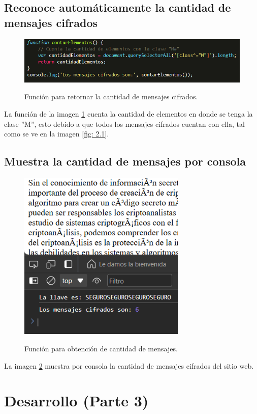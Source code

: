 \documentclass[letter,12pt]{article}
\begin{document}
\subsection{Reconoce automáticamente la cantidad de mensajes cifrados}
    \begin{figure}[H]
        \centering
        \includegraphics[width=15cm]{img/parte 2/3.1.png}
        \label{fig: 3.1}
        \caption{Función para retornar la cantidad de mensajes cifrados.}
    \end{figure}

La función de la imagen \ref{fig: 3.1} cuenta la cantidad de elementos en donde se tenga la clase ''M'', esto debido a que todos los mensajes cifrados cuentan con ella, tal como se ve en la imagen \ref{fig: 2.1}.

\subsection{Muestra la cantidad de mensajes por consola}
    \begin{figure}[H]
        \centering
        \includegraphics[width=8cm]{img/parte 2/cantidad.png}
        \label{fig: cantidad}
        \caption{Función para obtención de cantidad de mensajes.}
    \end{figure}

La imagen \ref{fig: cantidad} muestra por consola la cantidad de mensajes cifrados del sitio web.

\section{Desarrollo (Parte 3)}
\end{document}

